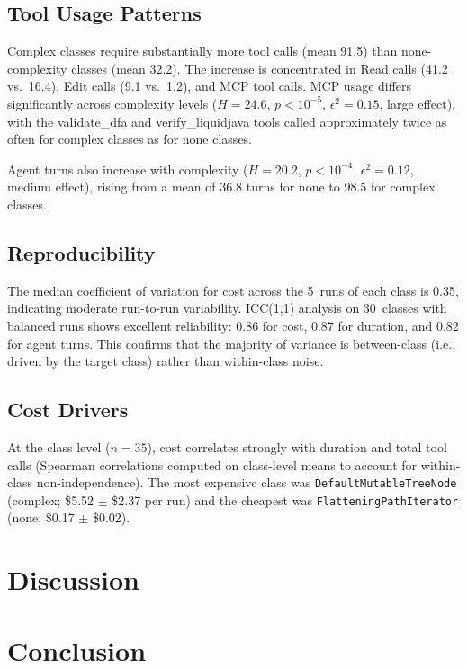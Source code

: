 \documentclass[sigconf]{acmart}
\begin{document}
\subsection{Tool Usage Patterns}

Complex classes require substantially more tool calls (mean 91.5) than none-complexity classes (mean 32.2). The increase is concentrated in Read calls (41.2 vs.\ 16.4), Edit calls (9.1 vs.\ 1.2), and MCP tool calls. MCP usage differs significantly across complexity levels ($H = 24.6$, $p < 10^{-5}$, $\epsilon^2 = 0.15$, large effect), with the validate\_dfa and verify\_liquidjava tools called approximately twice as often for complex classes as for none classes.

Agent turns also increase with complexity ($H = 20.2$, $p < 10^{-4}$, $\epsilon^2 = 0.12$, medium effect), rising from a mean of 36.8 turns for none to 98.5 for complex classes.

\subsection{Reproducibility}

The median coefficient of variation for cost across the 5~runs of each class is 0.35, indicating moderate run-to-run variability. ICC(1,1) analysis on 30~classes with balanced runs shows excellent reliability: 0.86 for cost, 0.87 for duration, and 0.82 for agent turns. This confirms that the majority of variance is between-class (i.e., driven by the target class) rather than within-class noise.

\subsection{Cost Drivers}

At the class level ($n = 35$), cost correlates strongly with duration and total tool calls (Spearman correlations computed on class-level means to account for within-class non-independence). The most expensive class was \texttt{DefaultMutableTreeNode} (complex; \$5.52 $\pm$ \$2.37 per run) and the cheapest was \texttt{FlatteningPathIterator} (none; \$0.17 $\pm$ \$0.02).

\section{Discussion}


\section{Conclusion}

\end{document}
